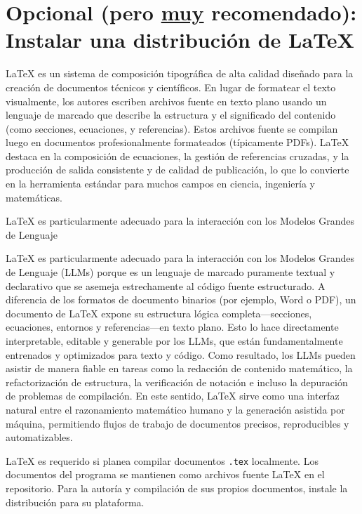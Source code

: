 \section{Opcional (pero \underline{muy} recomendado): Instalar una distribución de \LaTeX{}}\label{sec:latex-install}

\LaTeX{} es un sistema de composición tipográfica de alta calidad diseñado para la creación de
documentos técnicos y científicos. En lugar de formatear el texto visualmente,
los autores escriben archivos fuente en texto plano usando un lenguaje de marcado que describe
la estructura y el significado del contenido (como secciones, ecuaciones,
y referencias). Estos archivos fuente se compilan luego en documentos
profesionalmente formateados (típicamente PDFs). \LaTeX{} destaca en la composición de
ecuaciones, la gestión de referencias cruzadas, y la producción de salida consistente y
de calidad de publicación, lo que lo convierte en la herramienta estándar para muchos campos
en ciencia, ingeniería y matemáticas.

\begin{infobox}
	\LaTeX{} es particularmente adecuado para la interacción con los Modelos Grandes de Lenguaje
\end{infobox}


\LaTeX{} es particularmente adecuado para la interacción con los Modelos Grandes de Lenguaje
(LLMs) porque es un lenguaje de marcado puramente textual y declarativo que se asemeja
estrechamente al código fuente estructurado. A diferencia de los formatos de documento binarios (por ejemplo, Word o PDF),
un documento de \LaTeX{} expone su estructura lógica completa---secciones, ecuaciones,
entornos y referencias---en texto plano. Esto lo hace directamente
interpretable, editable y generable por los LLMs, que están fundamentalmente
entrenados y optimizados para texto y código. Como resultado, los LLMs pueden asistir
de manera fiable en tareas como la redacción de contenido matemático, la refactorización de estructura,
la verificación de notación e incluso la depuración de problemas de compilación. En este sentido,
\LaTeX{} sirve como una interfaz natural entre el razonamiento matemático humano
y la generación asistida por máquina, permitiendo flujos de trabajo de documentos
precisos, reproducibles y automatizables.

\LaTeX{} es requerido si planea compilar documentos \texttt{.tex}
localmente. Los documentos del programa se mantienen como archivos fuente \LaTeX{}
en el repositorio. Para la autoría y compilación de sus propios
documentos, instale la distribución para su plataforma.



